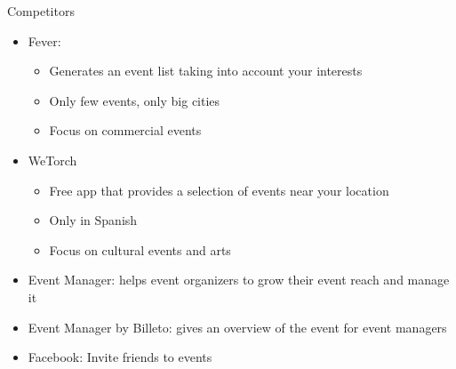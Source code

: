 \documentclass[logo=EURECOM,english]{eurecombeamer}
\begin{document}
\begin{frame}{Competitors}
\begin{itemize}
\item Fever:
	\begin{itemize}
	\item Generates an event list taking into account your interests
	\item Only few events, only big cities
	\item Focus on commercial events
	\end{itemize}
\item WeTorch
	\begin{itemize}
	\item Free app that provides a selection of events near your location
	\item Only in Spanish
	\item Focus on cultural events and arts
	\end{itemize}
\item Event Manager: helps event organizers to grow their event reach and manage it
\item Event Manager by Billeto: gives an overview of the event for event managers
\item Facebook: Invite friends to events
\end{itemize}
\end{frame}
\end{document}
